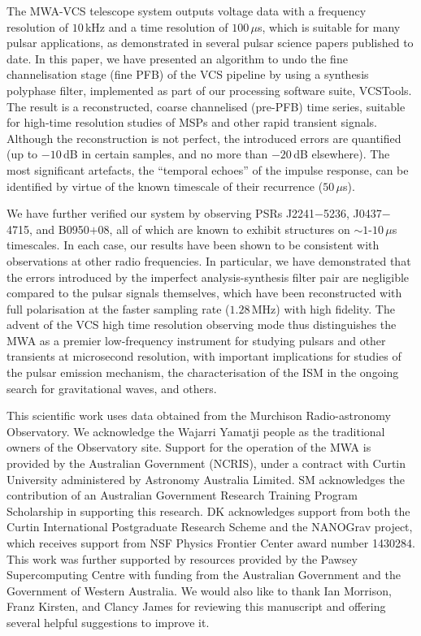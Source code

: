 \documentclass{pasa}%
\newcommand{\vcstools}{VCSTools}
\newcommand{\psrslowB}{B0950$+$08}
\newcommand{\psrkaurJ}{J2241$-$5236}
\newcommand{\psrbhatJ}{J0437$-$4715}
\begin{document}
The MWA-VCS telescope system outputs voltage data with a frequency resolution of $10\,$kHz and a time resolution of $100\,\mu$s, which is suitable for many pulsar applications, as demonstrated in several pulsar science papers published to date.
In this paper, we have presented an algorithm to undo the fine channelisation stage (fine PFB) of the VCS pipeline by using a synthesis polyphase filter, implemented as part of our processing software suite, \vcstools{}.
The result is a reconstructed, coarse channelised (pre-PFB) time series, suitable for high-time resolution studies of MSPs and other rapid transient signals.
Although the reconstruction is not perfect, the introduced errors are quantified (up to $-10\,$dB in certain samples, and no more than $-20\,$dB elsewhere).
The most significant artefacts, the ``temporal echoes'' of the impulse response, can be identified by virtue of the known timescale of their recurrence ($50\,\mu$s).

We have further verified our system by observing PSRs \psrkaurJ{}, \psrbhatJ{}, and \psrslowB{}, all of which are known to exhibit structures on $\sim 1$-$10\,\mu$s timescales.
In each case, our results have been shown to be consistent with observations at other radio frequencies.
In particular, we have demonstrated that the errors introduced by the imperfect analysis-synthesis filter pair are negligible compared to the pulsar signals themselves, which have been reconstructed with full polarisation at the faster sampling rate ($1.28\,$MHz) with high fidelity.
The advent of the VCS high time resolution observing mode thus distinguishes the MWA as a premier low-frequency instrument for studying pulsars and other transients at microsecond resolution, with important implications for studies of the pulsar emission mechanism, the characterisation of the ISM in the ongoing search for gravitational waves, and others.

\begin{acknowledgements}
This scientific work uses data obtained from the Murchison Radio-astronomy Observatory. We acknowledge the Wajarri Yamatji people as the traditional owners of the Observatory site.
Support for the operation of the MWA is provided by the Australian Government (NCRIS), under a contract with Curtin University administered by Astronomy Australia Limited.
SM acknowledges the contribution of an Australian Government Research Training Program Scholarship in supporting this research.
DK acknowledges support from both the Curtin International Postgraduate Research Scheme and the NANOGrav project, which receives support from NSF Physics Frontier Center award number 1430284.
This work was further supported by resources provided by the Pawsey Supercomputing Centre with funding from the Australian Government and the Government of Western Australia.
We would also like to thank Ian Morrison, Franz Kirsten, and Clancy James for reviewing this manuscript and offering several helpful suggestions to improve it.
\end{acknowledgements}
\end{document}
